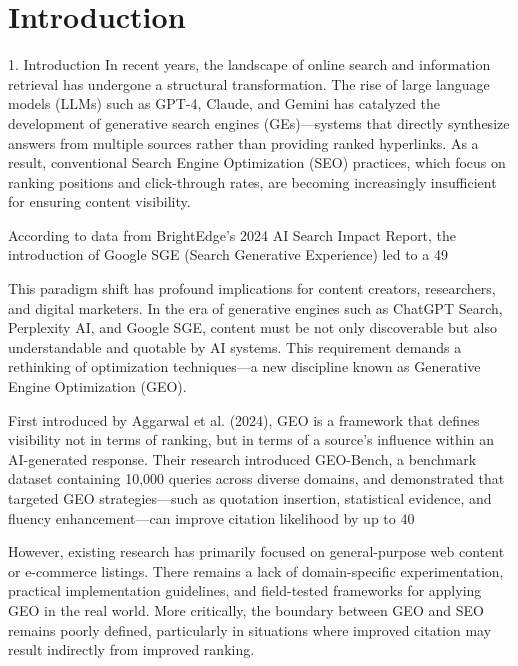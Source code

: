 \section{Introduction}
1. Introduction
In recent years, the landscape of online search and information retrieval has undergone a structural transformation. The rise of large language models (LLMs) such as GPT-4, Claude, and Gemini has catalyzed the development of generative search engines (GEs)—systems that directly synthesize answers from multiple sources rather than providing ranked hyperlinks. As a result, conventional Search Engine Optimization (SEO) practices, which focus on ranking positions and click-through rates, are becoming increasingly insufficient for ensuring content visibility.

According to data from BrightEdge’s 2024 AI Search Impact Report, the introduction of Google SGE (Search Generative Experience) led to a 49%

This paradigm shift has profound implications for content creators, researchers, and digital marketers. In the era of generative engines such as ChatGPT Search, Perplexity AI, and Google SGE, content must be not only discoverable but also understandable and quotable by AI systems. This requirement demands a rethinking of optimization techniques—a new discipline known as Generative Engine Optimization (GEO).

First introduced by Aggarwal et al. (2024), GEO is a framework that defines visibility not in terms of ranking, but in terms of a source’s influence within an AI-generated response. Their research introduced GEO-Bench, a benchmark dataset containing 10,000 queries across diverse domains, and demonstrated that targeted GEO strategies—such as quotation insertion, statistical evidence, and fluency enhancement—can improve citation likelihood by up to 40%

However, existing research has primarily focused on general-purpose web content or e-commerce listings. There remains a lack of domain-specific experimentation, practical implementation guidelines, and field-tested frameworks for applying GEO in the real world. More critically, the boundary between GEO and SEO remains poorly defined, particularly in situations where improved citation may result indirectly from improved ranking.


